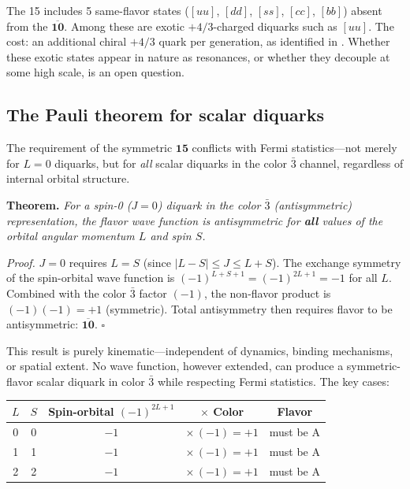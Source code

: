 \documentclass[12pt,a4paper]{article}
\begin{document}
The 15 includes 5 same-flavor states ($[uu]$, $[dd]$, $[ss]$, 
$[cc]$, $[bb]$) absent from the $\overline{\mathbf{10}}$. Among 
these are exotic $+4/3$-charged diquarks such as $[uu]$. The cost: 
an additional chiral $+4/3$ quark per generation, as identified 
in \cite{Rivero2005}. Whether these exotic states appear in nature 
as resonances, or whether they decouple at some high scale, is an 
open question.

\subsection{The Pauli theorem for scalar diquarks}
\label{subsec:pauli}

The requirement of the symmetric $\mathbf{15}$ conflicts with 
Fermi statistics---not merely for $L=0$ diquarks, but for 
\emph{all} scalar diquarks in the color $\bar{3}$ channel, 
regardless of internal orbital structure.

\medskip
\noindent\textbf{Theorem.}
\textit{For a spin-0 ($J=0$) diquark in the color $\bar{3}$ 
(antisymmetric) representation, the flavor wave function is 
antisymmetric for \textbf{all} values of the orbital angular 
momentum $L$ and spin $S$.}

\medskip
\noindent\textit{Proof.}
$J = 0$ requires $L = S$ (since $|L - S| \leq J \leq L + S$). 
The exchange symmetry of the spin-orbital wave function is 
$(-1)^{L+S+1} = (-1)^{2L+1} = -1$ for all $L$. Combined with 
the color $\bar{3}$ factor $(-1)$, the non-flavor product is 
$(-1)(-1) = +1$ (symmetric). Total antisymmetry then requires 
flavor to be antisymmetric: $\overline{\mathbf{10}}$. \hfill$\square$

\medskip
This result is purely kinematic---independent of dynamics, 
binding mechanisms, or spatial extent. No wave function, however 
extended, can produce a symmetric-flavor scalar diquark in color 
$\bar{3}$ while respecting Fermi statistics. The key cases:

\begin{center}
\begin{tabular}{ccccc}
\toprule
$L$ & $S$ & Spin-orbital $(-1)^{2L+1}$ & $\times$ Color & Flavor \\
\midrule
0 & 0 & $-1$ & $\times\,(-1) = +1$ & must be A \\
1 & 1 & $-1$ & $\times\,(-1) = +1$ & must be A \\
2 & 2 & $-1$ & $\times\,(-1) = +1$ & must be A \\
\bottomrule
\end{tabular}
\end{center}
\end{document}
